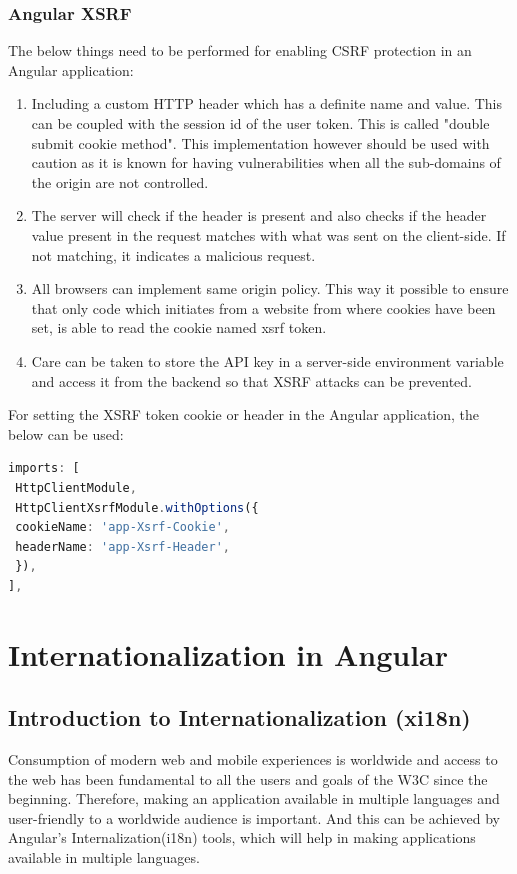 \documentclass{report}
\begin{document}
\subsection*{Angular XSRF}
The below things need to be performed for enabling CSRF protection in an Angular application:
\begin{enumerate}
	\item{Including a custom HTTP header which has a definite name and value. This can be coupled with the session id of the user token. This is called "double submit cookie method". This implementation however should be used with caution as it is known for having vulnerabilities when all the sub-domains of the origin are not controlled. }
	\item{The server will check if the header is present and also checks if the header value present in the request matches with what was sent on the client-side. If not matching, it indicates a malicious request.}
	\item{All browsers can implement same origin policy. This way it possible to ensure that only code which initiates from a website from where cookies have been set, is able to read the cookie named xsrf token.}
	\item{Care can be taken to store the API key in a server-side environment variable and access it from the backend so that XSRF attacks can be prevented.}
\end{enumerate}
For setting the XSRF token cookie or header in the Angular application, the below can be used:
\begin{lstlisting}[language=Typescript, caption=app.module.ts]
imports: [
 HttpClientModule,
 HttpClientXsrfModule.withOptions({
 cookieName: 'app-Xsrf-Cookie',
 headerName: 'app-Xsrf-Header',
 }),
],
\end{lstlisting}
\chapter{Internationalization in Angular}
\section{Introduction to Internationalization (xi18n)}
Consumption of modern web and mobile experiences is worldwide and access to the web has been fundamental to all the users and goals of the W3C since the beginning. Therefore, making an application available in multiple languages and user-friendly to a worldwide audience is important. And this can be achieved by Angular's Internalization(i18n) tools, which will help in making applications available in multiple languages.
\end{document}

